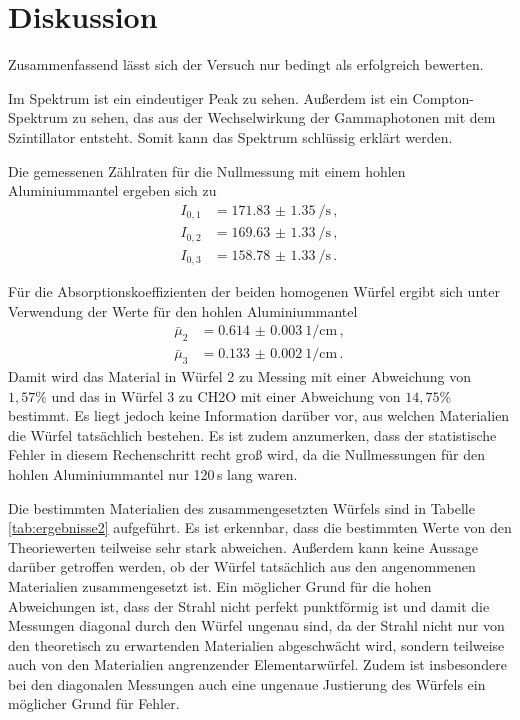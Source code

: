 \section{Diskussion}
\label{sec:Diskussion}

Zusammenfassend lässt sich der Versuch nur bedingt als erfolgreich bewerten.

Im Spektrum ist ein eindeutiger Peak zu sehen. Außerdem ist ein Compton-Spektrum
zu sehen, das aus der Wechselwirkung der Gammaphotonen mit dem Szintillator entsteht.
Somit kann das Spektrum schlüssig erklärt werden.

Die gemessenen Zählraten für die Nullmessung mit einem hohlen Aluminiummantel
ergeben sich zu
\begin{align*}
  I_{0,1}&=\SI{171.83(135)}{\per\second} \,, \\
  I_{0,2}&=\SI{169.63(133)}{\per\second} \,, \\
  I_{0,3}&=\SI{158.78(133)}{\per\second} \,.
\end{align*}

Für die Absorptionskoeffizienten der beiden homogenen Würfel ergibt sich unter Verwendung der
Werte für den hohlen Aluminiummantel
\begin{align*}
  \bar{\mu}_2&= \SI{0.614(3)}{1\per \centi\metre}\,, \\
  \bar{\mu}_3&=\SI{0.133(2)}{1\per \centi\metre} \,.
\end{align*}
Damit wird das Material in Würfel 2 zu Messing mit einer Abweichung von $1{,}57\%$
und das in Würfel 3 zu CH2O mit einer Abweichung von $14{,}75\%$ bestimmt. Es liegt
jedoch keine Information darüber vor, aus welchen Materialien die Würfel tatsächlich bestehen.
Es ist zudem anzumerken, dass der statistische Fehler in diesem Rechenschritt recht groß
wird, da die Nullmessungen für den hohlen Aluminiummantel nur 120\,s lang waren.

Die bestimmten Materialien des zusammengesetzten Würfels sind in Tabelle \ref{tab:ergebnisse2}
aufgeführt. Es ist erkennbar, dass die bestimmten Werte von den Theoriewerten teilweise sehr stark abweichen. Außerdem kann keine Aussage darüber getroffen werden, ob der Würfel tatsächlich aus den angenommenen Materialien zusammengesetzt ist. Ein möglicher Grund für die hohen Abweichungen ist, dass der
Strahl nicht perfekt punktförmig ist und damit die Messungen diagonal durch den Würfel ungenau sind, da der Strahl nicht nur von den theoretisch zu erwartenden Materialien abgeschwächt wird, sondern teilweise auch von den Materialien angrenzender Elementarwürfel. Zudem ist insbesondere bei den diagonalen Messungen auch eine ungenaue Justierung des Würfels ein möglicher Grund für Fehler.
